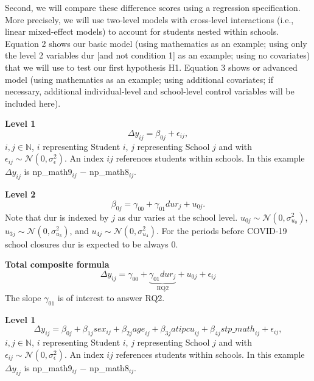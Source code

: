 Second, we will compare these difference scores using a regression specification. More precisely, we will use two-level models with cross-level interactions (i.e., linear mixed-effect models) to account for students nested within schools. Equation 2 shows our basic model (using mathematics as an example; using only the level 2 variables dur [and not condition 1] as an example; using no covariates) that we will use to test our first hypothesis H1. Equation 3 shows or advanced model (using mathematics as an example; using additional covariates; if necessary, additional individual-level and school-level control variables will be included here).

\noindent\textbf{Level 1}
\begin{equation}\label{eqn:2}\tag{2.1}
    \Delta y_{ij} = \beta_{0j} + \epsilon_{ij},
\end{equation}
$i,j \in \mathbb{N}$, $i$ representing Student $i$, $j$ representing School $j$ and with $\epsilon_{ij} \sim \mathcal{N}(0, \sigma_\epsilon^2)$. An index $ij$ references students within schools. In this example $\Delta y_{ij}$ is np\_math9$_{ij}$ $-$ np\_math8$_{ij}$.

\noindent\textbf{Level 2}
\begin{equation}\tag{2.2}
    \beta_{0j} = \gamma_{00} + \gamma_{01} {dur}_j + u_{0j}.
\end{equation}
Note that dur is indexed by $j$ as dur varies at the school level. $u_{0j} \sim \mathcal{N}(0, \sigma_{u_0}^2)$, $u_{3j} \sim \mathcal{N}(0, \sigma_{u_3}^2)$, and $u_{4j} \sim \mathcal{N}(0, \sigma_{u_4}^2)$. For the periods before COVID-19 school closures dur is expected to be always 0.

\noindent\textbf{Total composite formula}
\begin{equation}\tag{2.3}
    \Delta y_{ij} = \gamma_{00} + \underbrace{\gamma_{01} {dur}_j}_{\text{RQ2}} + u_{0j} + \epsilon_{ij}
\end{equation}
The slope $\gamma_{01}$ is of interest to answer RQ2.

\noindent\textbf{Level 1}
\begin{equation}\label{eqn:3}\tag{3.1}
    \Delta y_{ij} = \beta_{0j} + \beta_{1j} {sex}_{ij} + \beta_{2j} {age}_{ij} + \beta_{3j} {atipcu}_{ij} + \beta_{4j} {stp\_math}_{ij} + \epsilon_{ij},
\end{equation}
$i,j \in \mathbb{N}$, $i$ representing Student $i$, $j$ representing School $j$ and with $\epsilon_{ij} \sim \mathcal{N}(0, \sigma_\epsilon^2)$. An index $ij$ references students within schools. In this example $\Delta y_{ij}$ is np\_math9$_{ij}$ $-$ np\_math8$_{ij}$.

